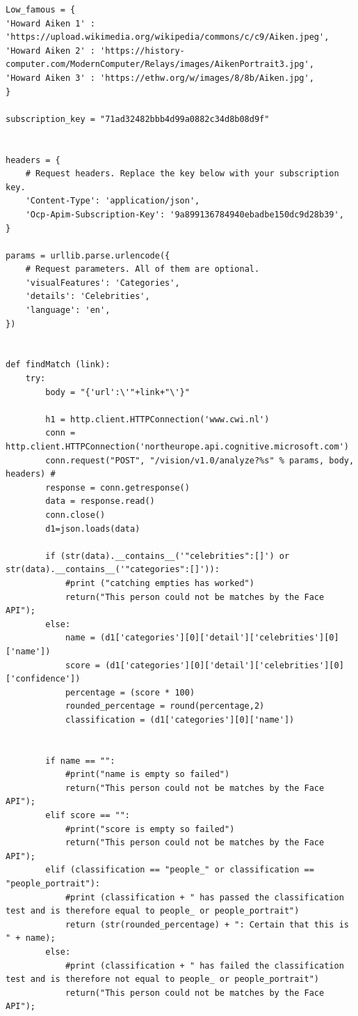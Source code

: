 \documentclass[12pt,a4paper]{article}
\begin{document}
\begin{appendices}
\begin{lstlisting}
Low_famous = { 
'Howard Aiken 1' : 'https://upload.wikimedia.org/wikipedia/commons/c/c9/Aiken.jpeg',
'Howard Aiken 2' : 'https://history-computer.com/ModernComputer/Relays/images/AikenPortrait3.jpg',
'Howard Aiken 3' : 'https://ethw.org/w/images/8/8b/Aiken.jpg',
}  

subscription_key = "71ad32482bbb4d99a0882c34d8b08d9f"
  

headers = {
    # Request headers. Replace the key below with your subscription key.
    'Content-Type': 'application/json',
    'Ocp-Apim-Subscription-Key': '9a899136784940ebadbe150dc9d28b39',
}

params = urllib.parse.urlencode({
    # Request parameters. All of them are optional.
    'visualFeatures': 'Categories',
    'details': 'Celebrities',
    'language': 'en',
})


def findMatch (link): 
    try:      
        body = "{'url':\'"+link+"\'}" 

        h1 = http.client.HTTPConnection('www.cwi.nl')
        conn = http.client.HTTPConnection('northeurope.api.cognitive.microsoft.com') 
        conn.request("POST", "/vision/v1.0/analyze?%s" % params, body, headers) #
        response = conn.getresponse() 
        data = response.read() 
        conn.close() 
        d1=json.loads(data)     
         
        if (str(data).__contains__('"celebrities":[]') or str(data).__contains__('"categories":[]')):  
            #print ("catching empties has worked")
            return("This person could not be matches by the Face API");    
        else:  
            name = (d1['categories'][0]['detail']['celebrities'][0]['name']) 
            score = (d1['categories'][0]['detail']['celebrities'][0]['confidence'])  
            percentage = (score * 100) 
            rounded_percentage = round(percentage,2) 
            classification = (d1['categories'][0]['name'])       


        if name == "":  
            #print("name is empty so failed")
            return("This person could not be matches by the Face API");  
        elif score == "":  
            #print("score is empty so failed")
            return("This person could not be matches by the Face API");  
        elif (classification == "people_" or classification == "people_portrait"):   
            #print (classification + " has passed the classification test and is therefore equal to people_ or people_portrait")
            return (str(rounded_percentage) + ": Certain that this is " + name);  
        else:  
            #print (classification + " has failed the classification test and is therefore not equal to people_ or people_portrait")
            return("This person could not be matches by the Face API");
        

\end{lstlisting}
\end{appendices}
\end{document}
